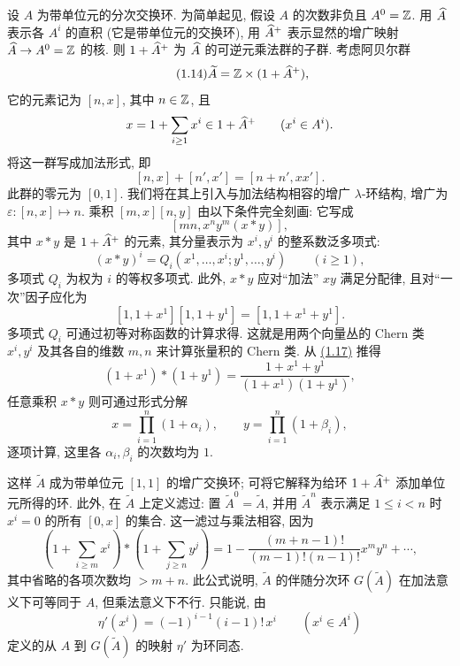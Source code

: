 设 $A$ 为带单位元的分次交换环. 为简单起见, 假设 $A$ 的次数非负且 $A^0=\mathbb Z$. 用 $\widehat A$ 表示各 $A^i$ 的直积 (它是带单位元的交换环), 用 $\widehat A^{+}$ 表示显然的增广映射 $\widehat A\to A^0=\mathbb Z$ 的核. 则 $1+\widehat A^{+}$ 为 $\widehat A$ 的可逆元乘法群的子群. 考虑阿贝尔群
\begin{equation}\tag{1.14}
\widetilde A=\mathbb Z\times (1+\widehat A^{+}),
\end{equation}
它的元素记为 $[n,x]$, 其中 $n\in\mathbb Z$, 且
\[
x=1+\sum_{i\geq 1}x^i\in 1+\widehat A^{+}\qquad (x^i\in A^i).
\]
将这一群写成加法形式, 即
\begin{equation}\tag{1.15}
[n,x]+[n',x']=[n+n',xx'].
\end{equation}
此群的零元为 $[0,1]$. 我们将在其上引入与加法结构相容的增广 $\lambda$-环结构, 增广为 $\varepsilon:[n,x]\mapsto n$. 乘积 $[m,x][n,y]$ 由以下条件完全刻画: 它写成
\[
[mn,x^n y^m(x*y)],
\]
其中 $x*y$ 是 $1+\widehat A^{+}$ 的元素, 其分量表示为 $x^i,y^i$ 的整系数泛多项式:
\begin{equation}\tag{1.16}
(x*y)^i=Q_i(x^1,\ldots,x^i;y^1,\ldots,y^i)\qquad (i\geq 1),
\end{equation}
多项式 $Q_i$ 为权为 $i$ 的等权多项式. 此外, $x*y$ 应对“加法” $xy$ 满足分配律, 且对“一次”因子应化为
\begin{equation}\tag{1.17}
[1,1+x^1][1,1+y^1]=[1,1+x^1+y^1].
\end{equation}
多项式 $Q_i$ 可通过初等对称函数的计算求得. 这就是用两个向量丛的 Chern 类 $x^i,y^i$ 及其各自的维数 $m,n$ 来计算张量积的 Chern 类. 从 \hyperlink{sga6.e00.eq.1-17}{(1.17)} 推得
\begin{equation}\tag{1.17 bis}
(1+x^1)*(1+y^1)=\frac{1+x^1+y^1}{(1+x^1)(1+y^1)},
\end{equation}
任意乘积 $x*y$ 则可通过形式分解
\[
x=\prod_{i=1}^n(1+\alpha_i),\qquad y=\prod_{i=1}^n(1+\beta_i),
\]
逐项计算, 这里各 $\alpha_i,\beta_i$ 的次数均为 $1$.

这样 $\widetilde A$ 成为带单位元 $[1,1]$ 的增广交换环; 可将它解释为给环 $1+\widehat A^{+}$ 添加单位元所得的环. 此外, 在 $\widetilde A$ 上定义滤过: 置 $\widetilde A^0=\widetilde A$, 并用 $\widetilde A^n$ 表示满足 $1\leq i<n$ 时 $x^i=0$ 的所有 $[0,x]$ 的集合. 这一滤过与乘法相容, 因为
\begin{equation}\tag{1.18}
\left(1+\sum_{i\geq m}x^i\right)*\left(1+\sum_{j\geq n}y^j\right)
=1-\frac{(m+n-1)!}{(m-1)!(n-1)!}x^m y^n+\cdots,
\end{equation}
其中省略的各项次数均 $>m+n$. 此公式说明, $\widetilde A$ 的伴随分次环 $G(\widetilde A)$ 在加法意义下可等同于 $A$, 但乘法意义下不行. 只能说, 由
\begin{equation}\tag{1.19}
\eta'(x^i)=(-1)^{i-1}(i-1)!\,x^i\qquad (x^i\in A^i)
\end{equation}
定义的从 $A$ 到 $G(\widetilde A)$ 的映射 $\eta'$ 为环同态.


